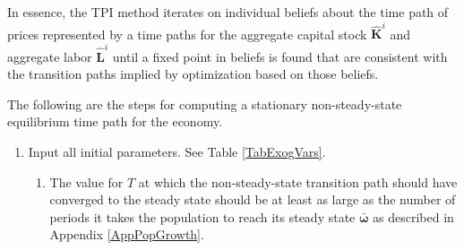\documentclass[letterpaper,12pt]{article}
\theoremstyle{definition}
\begin{document}
  In essence, the TPI method iterates on individual beliefs about the time path of prices represented by a time paths for the aggregate capital stock $\bm{\hat{K}}^i$ and aggregate labor $\bm{\hat{L}}^i$ until a fixed point in beliefs is found that are consistent with the transition paths implied by optimization based on those beliefs.

  The following are the steps for computing a stationary non-steady-state equilibrium time path for the economy.
  \begin{enumerate}
    \item Input all initial parameters. See Table \ref{TabExogVars}.
      \begin{enumerate}
        \item The value for $T$ at which the non-steady-state transition path should have converged to the steady state should be at least as large as the number of periods it takes the population to reach its steady state $\bm{\bar{\omega}}$ as described in Appendix \ref{AppPopGrowth}.
      \end{enumerate}


\end{enumerate}
\end{document}
